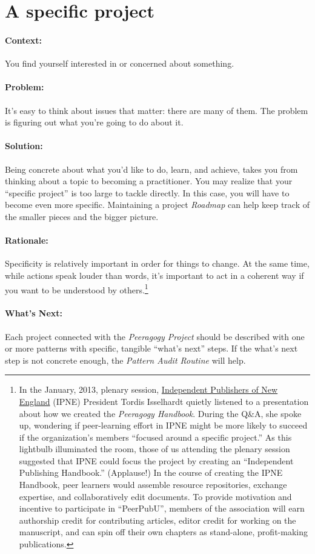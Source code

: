 \section{A specific project}
\paragraph{Context:}
You find yourself interested in or concerned about something.

\paragraph{Problem:}
It's easy to think about issues that matter: there are many of them. The problem is figuring out what you're going to do about it.

\paragraph{Solution:} 
Being concrete about what you'd like to do, learn, and achieve, takes you from thinking about a topic to becoming a
practitioner.  You may realize that your ``specific project'' is too large to tackle directly. In this case, you will have to become even more specific.  Maintaining a project \emph{Roadmap} can help keep track of the smaller pieces and the bigger picture.

\paragraph{Rationale:} 
Specificity is relatively important in order for things to change. At the same time, while actions speak
louder than words, it's important to act in a coherent way if you want
to be understood by others.\footnote{In the January, 2013, plenary
session, \href{http://ipne.org}{Independent Publishers of New England}
(IPNE) President Tordis Isselhardt quietly listened to a presentation
about how we created the \emph{Peeragogy Handbook}. During the Q\&A, she
spoke up, wondering if peer-learning effort in IPNE might be more likely
to succeed if the organization's members ``focused around a specific
project.'' As this lightbulb illuminated the room, those of us attending
the plenary session suggested that IPNE could focus the project by
creating an ``Independent Publishing Handbook.'' (Applause!) In the
course of creating the IPNE Handbook, peer learners would assemble
resource repositories, exchange expertise, and collaboratively edit
documents. To provide motivation and incentive to participate in
``PeerPubU'', members of the association will earn authorship credit for
contributing articles, editor credit for working on the manuscript, and
can spin off their own chapters as stand-alone, profit-making
publications.}

\paragraph{What's Next:}  Each project connected with the \emph{Peeragogy Project} should be described with one or more patterns with specific, tangible ``what's next'' steps.  If the what's next step is not concrete enough, the \emph{Pattern Audit Routine} will help.  
